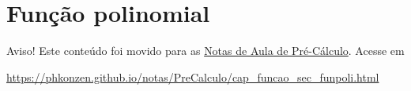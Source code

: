 


\section{Função polinomial}\label{cap_funcao_sec_funpoli}

\begin{center}
  Aviso! Este conteúdo foi movido para as \href{https://phkonzen.github.io/notas/PreCalculo/main.html}{Notas de Aula de Pré-Cálculo}. Acesse em

  \url{https://phkonzen.github.io/notas/PreCalculo/cap_funcao_sec_funpoli.html}
\end{center}


